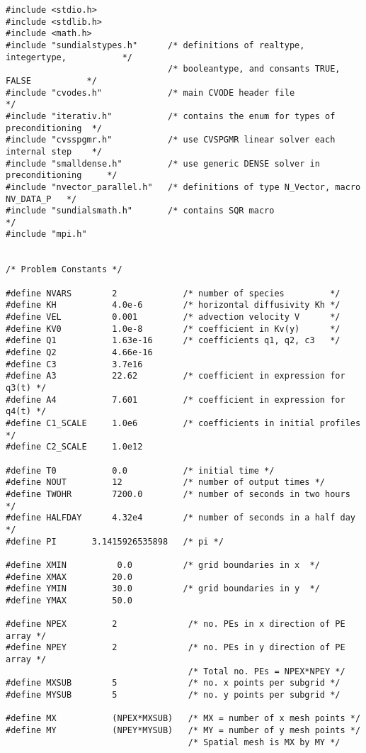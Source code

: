 \begin{verbatim}
#include <stdio.h>
#include <stdlib.h>
#include <math.h>
#include "sundialstypes.h"      /* definitions of realtype, integertype,           */
                                /* booleantype, and consants TRUE, FALSE           */
#include "cvodes.h"             /* main CVODE header file                          */
#include "iterativ.h"           /* contains the enum for types of preconditioning  */
#include "cvsspgmr.h"           /* use CVSPGMR linear solver each internal step    */
#include "smalldense.h"         /* use generic DENSE solver in preconditioning     */
#include "nvector_parallel.h"   /* definitions of type N_Vector, macro NV_DATA_P   */
#include "sundialsmath.h"       /* contains SQR macro                              */
#include "mpi.h"


/* Problem Constants */

#define NVARS        2             /* number of species         */
#define KH           4.0e-6        /* horizontal diffusivity Kh */
#define VEL          0.001         /* advection velocity V      */
#define KV0          1.0e-8        /* coefficient in Kv(y)      */
#define Q1           1.63e-16      /* coefficients q1, q2, c3   */ 
#define Q2           4.66e-16
#define C3           3.7e16
#define A3           22.62         /* coefficient in expression for q3(t) */
#define A4           7.601         /* coefficient in expression for q4(t) */
#define C1_SCALE     1.0e6         /* coefficients in initial profiles    */
#define C2_SCALE     1.0e12

#define T0           0.0           /* initial time */
#define NOUT         12            /* number of output times */
#define TWOHR        7200.0        /* number of seconds in two hours  */
#define HALFDAY      4.32e4        /* number of seconds in a half day */
#define PI       3.1415926535898   /* pi */ 

#define XMIN          0.0          /* grid boundaries in x  */
#define XMAX         20.0           
#define YMIN         30.0          /* grid boundaries in y  */
#define YMAX         50.0

#define NPEX         2              /* no. PEs in x direction of PE array */
#define NPEY         2              /* no. PEs in y direction of PE array */
                                    /* Total no. PEs = NPEX*NPEY */
#define MXSUB        5              /* no. x points per subgrid */
#define MYSUB        5              /* no. y points per subgrid */

#define MX           (NPEX*MXSUB)   /* MX = number of x mesh points */
#define MY           (NPEY*MYSUB)   /* MY = number of y mesh points */
                                    /* Spatial mesh is MX by MY */


\end{verbatim}
